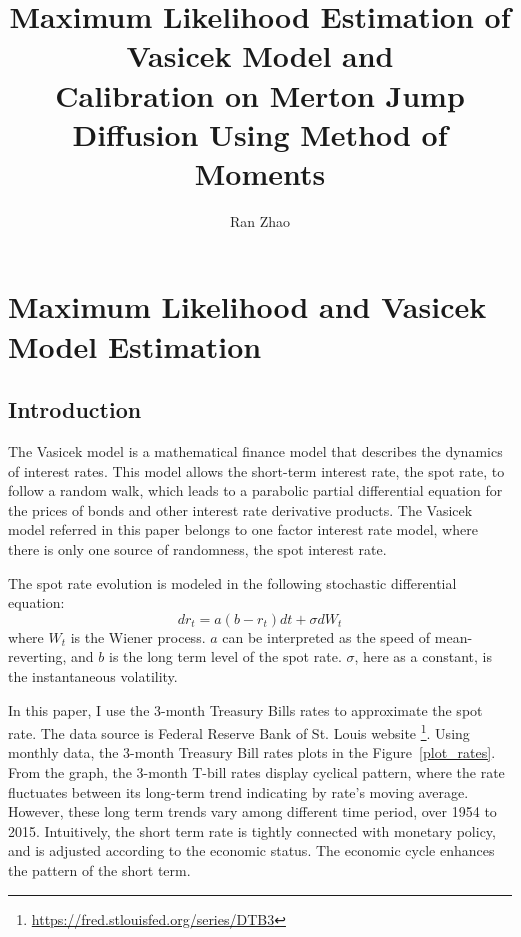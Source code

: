 \documentclass[11pt,reqno,final]{amsart}
\title{Maximum Likelihood Estimation of Vasicek Model and \\ Calibration on Merton Jump Diffusion Using Method of Moments}
\author{Ran Zhao}
\begin{document}
\begin{abstract}

\end{abstract}

\maketitle
%
%
%
\section{Maximum Likelihood and Vasicek Model Estimation}
\subsection{Introduction}
The Vasicek model \cite{V77} is a mathematical finance model that
describes the dynamics of interest rates. This model allows the short-term
interest rate, the spot rate, to follow a random walk, which leads
to a parabolic partial differential equation for the prices of bonds
and other interest rate derivative products. The Vasicek model referred in this paper
belongs to one factor interest rate model, where there is only one source of
randomness, the spot interest rate.

The spot rate evolution is modeled in the following stochastic differential equation:
\begin{equation} \label{vasicek_equation}
dr_t = a(b-r_t)dt + \sigma dW_t
\end{equation}
where $W_t$ is the Wiener process. $a$ can be interpreted as the speed of mean-reverting, and $b$ is the long term level of the spot rate. $\sigma$, here as
a constant, is the instantaneous volatility.

In this paper, I use the 3-month Treasury Bills rates to approximate the spot rate. The data source is Federal Reserve Bank of St. Louis website \footnote{\url{https://fred.stlouisfed.org/series/DTB3}}. Using monthly data, the 3-month Treasury Bill rates plots in the Figure~\ref{plot_rates}. From the graph, the 3-month T-bill rates display cyclical pattern, where the rate fluctuates between its long-term trend indicating by rate's moving average. However, these long term trends vary among different time period, over 1954 to 2015. Intuitively, the short term rate is tightly connected with monetary policy, and is adjusted according to the economic status. The economic cycle enhances the pattern of the short term.
\end{document}
